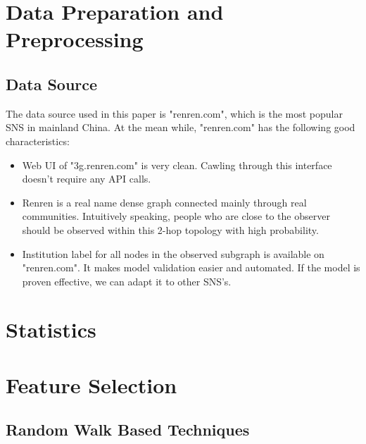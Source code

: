 \documentclass[11pt,a4paper]{article}
\begin{document}
\section{Data Preparation and Preprocessing}

\subsection{Data Source}

The data source used in this paper is "renren.com", which is the 
most popular SNS in mainland China. At the mean while, "renren.com" 
has the following good characteristics:
\begin{itemize}
	\item Web UI of "3g.renren.com" is very clean. Cawling through
	this interface doesn't require any API calls.  
	\item Renren is a real name dense graph connected mainly through 
	real communities. Intuitively speaking, 
	people who are close to the observer should be observed within 
	this 2-hop topology with high probability. 
	\item Institution label for all nodes in the observed subgraph
	is available on "renren.com". It makes model validation easier
	and automated. If the model is proven effective, we can adapt 
	it to other SNS's. 
\end{itemize}



\section{Statistics}

\section{Feature Selection}

\subsection{Random Walk Based Techniques}
\end{document}
